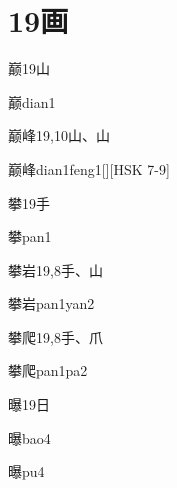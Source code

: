 
\section*{19画}

\begin{Entry}{巅}{19}{⼭}
  \begin{Phonetics}{巅}{dian1}
  \end{Phonetics}
\end{Entry}

\begin{Entry}{巅峰}{19,10}{⼭、⼭}
  \begin{Phonetics}{巅峰}{dian1feng1}[][HSK 7-9]
  \end{Phonetics}
\end{Entry}

\begin{Entry}{攀}{19}{⼿}
  \begin{Phonetics}{攀}{pan1}
  \end{Phonetics}
\end{Entry}

\begin{Entry}{攀岩}{19,8}{⼿、⼭}
  \begin{Phonetics}{攀岩}{pan1yan2}
  \end{Phonetics}
\end{Entry}

\begin{Entry}{攀爬}{19,8}{⼿、⽖}
  \begin{Phonetics}{攀爬}{pan1pa2}
  \end{Phonetics}
\end{Entry}

\begin{Entry}{曝}{19}{⽇}
  \begin{Phonetics}{曝}{bao4}
  \end{Phonetics}
  \begin{Phonetics}{曝}{pu4}
  \end{Phonetics}
\end{Entry}

